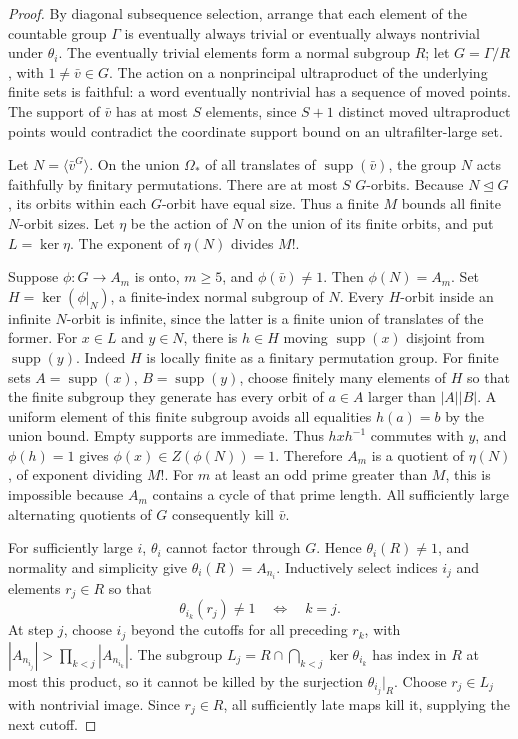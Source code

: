 \begin{proof}
By diagonal subsequence selection, arrange that each element of the
countable group \(\Gamma\) is eventually always trivial or eventually
always nontrivial under \(\theta_i\).
The eventually trivial elements form a normal subgroup \(R\);
let \(G=\Gamma/R\), with \(1\ne\bar v\in G\).
The action on a nonprincipal ultraproduct of the underlying finite
sets is faithful: a word eventually nontrivial has a sequence of
moved points. The support of \(\bar v\) has at most \(S\) elements,
since \(S+1\) distinct moved ultraproduct points would contradict the
coordinate support bound on an ultrafilter-large set.

Let \(N=\langle\bar v^G\rangle\). On the union \(\Omega_*\) of all
translates of \(\operatorname{supp}(\bar v)\), the group \(N\) acts
faithfully by finitary permutations. There are at most \(S\) \(G\)-orbits.
Because \(N\trianglelefteq G\), its orbits within each \(G\)-orbit have
equal size. Thus a finite \(M\) bounds all finite \(N\)-orbit sizes.
Let \(\eta\) be the action of \(N\) on the union of its finite orbits,
and put \(L=\ker\eta\). The exponent of \(\eta(N)\) divides \(M!\).

Suppose \(\phi:G\to A_m\) is onto, \(m\ge5\), and
\(\phi(\bar v)\ne1\). Then \(\phi(N)=A_m\).
Set \(H=\ker(\phi|_N)\), a finite-index normal subgroup of \(N\).
Every \(H\)-orbit inside an infinite \(N\)-orbit is infinite, since
the latter is a finite union of translates of the former.
For \(x\in L\) and \(y\in N\), there is \(h\in H\) moving
\(\operatorname{supp}(x)\) disjoint from \(\operatorname{supp}(y)\).
Indeed \(H\) is locally finite as a finitary permutation group.
For finite sets \(A=\operatorname{supp}(x)\), \(B=\operatorname{supp}(y)\),
choose finitely many elements of \(H\) so that the finite subgroup
they generate has every orbit of \(a\in A\) larger than \(|A||B|\).
A uniform element of this finite subgroup avoids all equalities
\(h(a)=b\) by the union bound. Empty supports are immediate.
Thus \(hxh^{-1}\) commutes with \(y\), and \(\phi(h)=1\) gives
\(\phi(x)\in Z(\phi(N))=1\).
Therefore \(A_m\) is a quotient of \(\eta(N)\), of exponent dividing
\(M!\). For \(m\) at least an odd prime greater than \(M\), this is
impossible because \(A_m\) contains a cycle of that prime length.
All sufficiently large alternating quotients of \(G\) consequently
kill \(\bar v\).

For sufficiently large \(i\), \(\theta_i\) cannot factor through \(G\).
Hence \(\theta_i(R)\ne1\), and normality and simplicity give
\(\theta_i(R)=A_{n_i}\).
Inductively select indices \(i_j\) and elements \(r_j\in R\) so that
\[
 \theta_{i_k}(r_j)\ne1\quad\Longleftrightarrow\quad k=j.
\]
At step \(j\), choose \(i_j\) beyond the cutoffs for all preceding
\(r_k\), with
\(|A_{n_{i_j}}|>\prod_{k<j}|A_{n_{i_k}}|\).
The subgroup
\(L_j=R\cap\bigcap_{k<j}\ker\theta_{i_k}\) has index in \(R\)
at most this product, so it cannot be killed by the surjection
\(\theta_{i_j}|_R\). Choose \(r_j\in L_j\) with nontrivial image.
Since \(r_j\in R\), all sufficiently late maps kill it, supplying
the next cutoff.


\end{proof}
